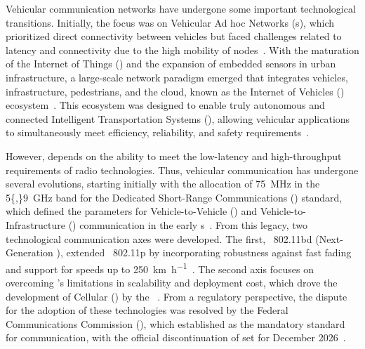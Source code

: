 Vehicular communication networks have undergone some important technological transitions. Initially, the focus was on Vehicular Ad hoc Networks (s), which prioritized direct connectivity between vehicles but faced challenges related to latency and connectivity due to the high mobility of nodes~\cite{kandali2025}. With the maturation of the Internet of Things () and the expansion of embedded sensors in urban infrastructure, a large-scale network paradigm emerged that integrates vehicles, infrastructure, pedestrians, and the cloud, known as the Internet of Vehicles () ecosystem~\cite{kandali2025}. This ecosystem was designed to enable truly autonomous and connected Intelligent Transportation Systems (), allowing vehicular applications to simultaneously meet efficiency, reliability, and safety requirements~\cite{uddin2025}.

However,  depends on the ability to meet the low-latency and high-throughput requirements of radio technologies. Thus, vehicular communication has undergone several evolutions, starting initially with the allocation of \SI{75}{\mega\hertz} in the \SI{5{,}9}{\giga\hertz} band for the Dedicated Short-Range Communications () standard, which defined the parameters for Vehicle-to-Vehicle () and Vehicle-to-Infrastructure () communication in the early s~\cite{zheng2015}. From this legacy, two technological communication axes were developed. The first, ~802.11bd (Next-Generation ), extended ~802.11p by incorporating robustness against fast fading and support for speeds up to \SI{250}{\kilo\meter\per\hour}~\cite{naik2019}. The second axis focuses on overcoming 's limitations in scalability and deployment cost, which drove the development of Cellular  () by the ~\cite{chen2017}. From a regulatory perspective, the dispute for the adoption of these technologies was resolved by the Federal Communications Commission (), which established  as the mandatory standard for  communication, with the official discontinuation of  set for December 2026~\cite{fcc2024_59ghz}.

